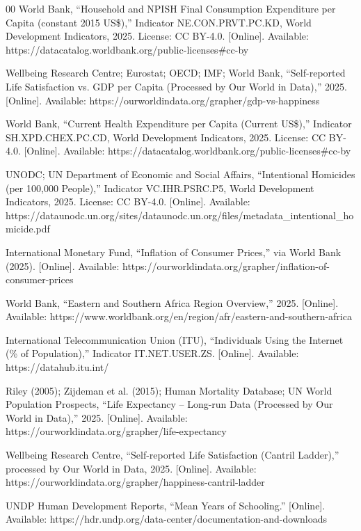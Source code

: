 \documentclass[conference]{IEEEtran}
\begin{document}
\begin{thebibliography}{00}
 World Bank, ``Household and NPISH Final Consumption Expenditure per Capita (constant 2015 US\$),'' Indicator NE.CON.PRVT.PC.KD, World Development Indicators, 2025. License: CC BY-4.0.  
[Online]. Available: https://datacatalog.worldbank.org/public-licenses\#cc-by

 Wellbeing Research Centre; Eurostat; OECD; IMF; World Bank, ``Self-reported Life Satisfaction vs. GDP per Capita (Processed by Our World in Data),'' 2025.  
[Online]. Available: https://ourworldindata.org/grapher/gdp-vs-happiness

 World Bank, ``Current Health Expenditure per Capita (Current US\$),'' Indicator SH.XPD.CHEX.PC.CD, World Development Indicators, 2025. License: CC BY-4.0.  
[Online]. Available: https://datacatalog.worldbank.org/public-licenses\#cc-by

 UNODC; UN Department of Economic and Social Affairs, ``Intentional Homicides (per 100,000 People),'' Indicator VC.IHR.PSRC.P5, World Development Indicators, 2025. License: CC BY-4.0.  
[Online]. Available: https://dataunodc.un.org/sites/dataunodc.un.org/files/metadata\_intentional\_homicide.pdf

 International Monetary Fund, ``Inflation of Consumer Prices,'' via World Bank (2025).  
[Online]. Available: https://ourworldindata.org/grapher/inflation-of-consumer-prices

 World Bank, ``Eastern and Southern Africa Region Overview,'' 2025.  
[Online]. Available: https://www.worldbank.org/en/region/afr/eastern-and-southern-africa

 International Telecommunication Union (ITU), ``Individuals Using the Internet (\% of Population),'' Indicator IT.NET.USER.ZS.  
[Online]. Available: https://datahub.itu.int/

 Riley (2005); Zijdeman et al. (2015); Human Mortality Database; UN World Population Prospects, ``Life Expectancy – Long-run Data (Processed by Our World in Data),'' 2025.  
[Online]. Available: https://ourworldindata.org/grapher/life-expectancy

 Wellbeing Research Centre, ``Self-reported Life Satisfaction (Cantril Ladder),'' processed by Our World in Data, 2025. [Online]. Available: https://ourworldindata.org/grapher/happiness-cantril-ladder

 UNDP Human Development Reports, ``Mean Years of Schooling.'' [Online]. Available: https://hdr.undp.org/data-center/documentation-and-downloads 


\end{thebibliography}
\end{document}

